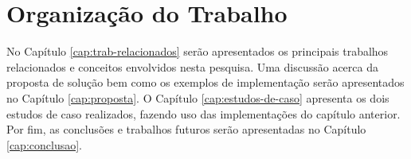 \section{Organização do Trabalho}

No Capítulo \ref{cap:trab-relacionados} serão apresentados os principais trabalhos relacionados e conceitos envolvidos nesta pesquisa.
Uma discussão acerca da proposta de solução bem como os exemplos de implementação serão apresentados no Capítulo \ref{cap:proposta}.
O Capítulo \ref{cap:estudos-de-caso} apresenta os dois estudos de caso realizados, fazendo uso das implementações do capítulo anterior.
Por fim, as conclusões e trabalhos futuros serão apresentadas no Capítulo \ref{cap:conclusao}.
